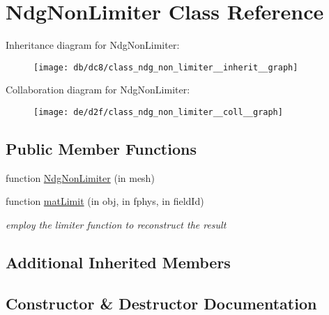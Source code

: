 \hypertarget{class_ndg_non_limiter}{}\section{Ndg\+Non\+Limiter Class Reference}
\label{class_ndg_non_limiter}


Inheritance diagram for Ndg\+Non\+Limiter\+:
\nopagebreak
\begin{figure}[H]
\begin{center}
\leavevmode
\texttt{[image: db/dc8/class\_ndg\_non\_limiter\_\_inherit\_\_graph]}
\end{center}
\end{figure}


Collaboration diagram for Ndg\+Non\+Limiter\+:
\nopagebreak
\begin{figure}[H]
\begin{center}
\leavevmode
\texttt{[image: de/d2f/class\_ndg\_non\_limiter\_\_coll\_\_graph]}
\end{center}
\end{figure}
\subsection*{Public Member Functions}
\begin{DoxyCompactItemize}
\item 
function \hyperlink{class_ndg_non_limiter_a4261a67081d137a0397414ba0a62048c}{Ndg\+Non\+Limiter} (in mesh)
\item 
function \hyperlink{class_ndg_non_limiter_a05c9175b9f4723c7f12d1db14a2f50a9}{mat\+Limit} (in obj, in fphys, in field\+Id)
\begin{DoxyCompactList}\small\item\em employ the limiter function to reconstruct the result \end{DoxyCompactList}\end{DoxyCompactItemize}
\subsection*{Additional Inherited Members}


\subsection{Constructor \& Destructor Documentation}
\mbox{\label{class_ndg_non_limiter_a4261a67081d137a0397414ba0a62048c}} 
